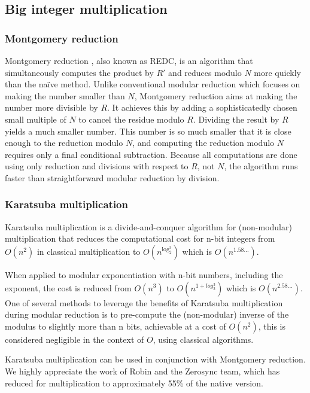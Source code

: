 \subsection{Big integer multiplication}

\subsubsection{Montgomery reduction}

Montgomery reduction \cite{website:Montgomery}, also known as REDC, is an algorithm that simultaneously computes the product by $R'$ and 
reduces modulo $N$ more quickly than the naïve method. Unlike conventional modular reduction 
which focuses on making the number smaller than $N$, Montgomery reduction aims at making the number more divisible by $R$. 
It achieves this by adding a sophisticatedly chosen small multiple of $N$ to cancel the residue modulo $R$. 
Dividing the result by $R$ yields a much smaller number. 
This number is so much smaller that it is close enough to the reduction modulo $N$, and 
computing the reduction modulo $N$ requires only a final conditional subtraction. 
Because all computations are done using only reduction and divisions with respect to $R$, not $N$, the algorithm runs faster than
straightforward modular reduction by division.


\subsubsection{Karatsuba multiplication}
Karatsuba multiplication \cite{website:Karatsuba} is a divide-and-conquer algorithm for (non-modular) multiplication that reduces the computational cost for n-bit integers from $O(n^2)$
in classical multiplication to $O(n^{\log_2^3})$ which is $O(n^{1.58…})$.

When applied to modular exponentiation with n-bit numbers, including the exponent, the cost is reduced from $O(n^3)$ to $O(n^{1+log_2^3})$ 
which is $O(n^{2.58…})$. One of several methods to leverage the benefits of Karatsuba multiplication during modular reduction is to pre-compute the (non-modular) 
inverse of the modulus to slightly more than n bits, achievable at a cost of $O(n^2)$, this is considered negligible in the context of $O$,
using classical algorithms.

Karatsuba multiplication can be used in conjunction with Montgomery reduction. We highly appreciate the work \cite{website:PR75} of Robin and the Zerosync team, which has reduced 
for multiplication to approximately 55\% of the native version.
